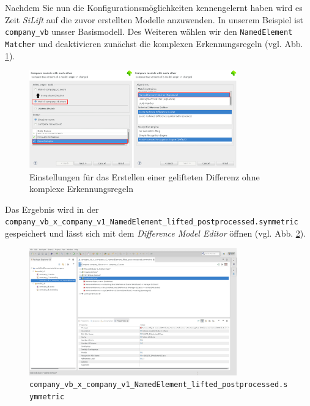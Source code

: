 Nachdem Sie nun die Konfigurationsmöglichkeiten kennengelernt haben wird es Zeit \textit{SiLift} auf die zuvor erstellten Modelle anzuwenden.
In unserem Beispiel ist \texttt{company\_vb} unsser Basismodell. Des Weiteren wählen wir den \texttt{NamedElement Matcher} und deaktivieren zunächst die komplexen Erkennungsregeln (vgl. Abb. \ref{silift-tutorial_compare_config}).

\begin{figure}[h!]
\centering
\includegraphics[width=0.8\textwidth]{lifting/graphics/silift-tutorial_compare_config.png}
\caption{Einstellungen für das Erstellen einer gelifteten Differenz ohne komplexe Erkennungsregeln}
\label{silift-tutorial_compare_config}
\end{figure}

Das Ergebnis wird in der \texttt{company\_vb\_x\_company\_v1\_NamedElement\_lifted\_post\-pro\-cessed.symmetric} gespeichert und lässt sich mit dem \textit{Difference Model Editor} öffnen (vgl. Abb. \ref{silift-tutorial_compare_atomic_lifted}).

\begin{figure}[h!]
\centering
\includegraphics[width=0.8\textwidth]{lifting/graphics/silift-tutorial_compare_atomic_lifted.png}
\caption{\texttt{company\_vb\_x\_company\_v1\_NamedElement\_lifted\_post\-pro\-cessed.symmetric}}
\label{silift-tutorial_compare_atomic_lifted}
\end{figure}

